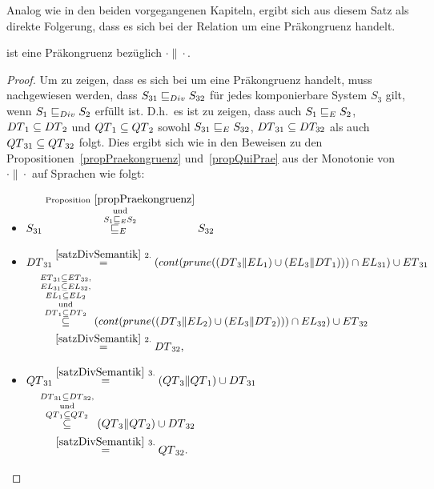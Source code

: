 Analog wie in den beiden vorgegangenen Kapiteln, ergibt sich aus diesem Satz
als direkte Folgerung, dass es sich bei der Relation \DRel{} um eine
Präkongruenz handelt.

\begin{prop}
\label{propDivPrae}
  \DRel{} ist eine Präkongruenz bezüglich $\cdot\|\cdot$.
\end{prop}

\begin{proof}
  Um zu zeigen, dass es sich bei \DRel{} um eine Präkongruenz handelt, muss
  nachgewiesen werden, dass $S_{31}\sqsubseteq _{Div}{} S_{32}$ für jedes komponierbare
  System $S_3$ gilt, wenn $S_1\sqsubseteq _{Div}{} S_2$ erfüllt ist.  D.h.\ es ist
  zu zeigen, dass auch $S_1\sqsubseteq _E{} S_2$, $DT{}_1\subseteq DT{}_2$ und
  $QT{}_1\subseteq QT{}_2$ sowohl $S_{31}\sqsubseteq _E{} S_{32}$,
  $DT{}_{31}\subseteq DT_{32}$ als auch $QT{}_{31}\subseteq QT{}_{32}$
  folgt. Dies ergibt sich wie in den Beweisen zu den
  Propositionen~\ref{propPraekongruenz} und~\ref{propQuiPrae} aus der Monotonie
  von $\cdot\|\cdot$ auf Sprachen wie folgt:
  \begin{itemize}
    \item $\begin{aligned}[t]
        S_{31}
        \overset{\mathrm{Proposition}~\ref{propPraekongruenz}}{%
        \overset{\mathrm{und}}{\overset{S_1\ERel{} S_2}{\ERel{}}}} S_{32}
    \end{aligned}$
    \item $\begin{aligned}[t]
        \DT{}_{31} &\overset{\ref{satzDivSemantik}~2.}{=}
        (\cont{}(\prune{}((\DT{}_3\|\EL{}_1) \cup (\EL{}_3\|\DT{}_1)))\cap
        \EL_{31}) \cup \ET{}_{31}\\
        &\hspace{-0.5cm}\overset{\ET{}_{31}\subseteq
      \ET{}_{32},}{\overset{\EL{}_{31}\subseteq
        \EL{}_{32},}{\overset{\EL{}_1\subseteq
      \EL{}_2}{\overset{\mathrm{und}}{\overset{\DT{}_1\subseteq
  \DT{}_2}{\subseteq}}}}} (\cont{}(\prune{}((\DT{}_3\|\EL{}_2) \cup
  (\EL{}_3\|\DT{}_2)))\cap \EL_{32}) \cup \ET{}_{32}\\
      &\overset{\ref{satzDivSemantik}~2.}{=} \DT{}_{32},
    \end{aligned}$
    \item $\begin{aligned}[t]
        \QT{}_{31} &\overset{\ref{satzDivSemantik}~3.}{=} (\QT{}_3\|\QT{}_1)
        \cup \DT{}_{31}\\
        &\hspace{-0.5cm}\overset{\DT{}_{31}\subseteq
      \DT{}_{32},}{\overset{\mathrm{und}}{\overset{\QT{}_1\subseteq
      \QT{}_2}{\subseteq}}} (\QT{}_3\|\QT{}_2) \cup \DT{}_{32}\\
      &\overset{\ref{satzDivSemantik}~3.}{=} \QT{}_{32}.
    \end{aligned}$
  \end{itemize}
\end{proof}

